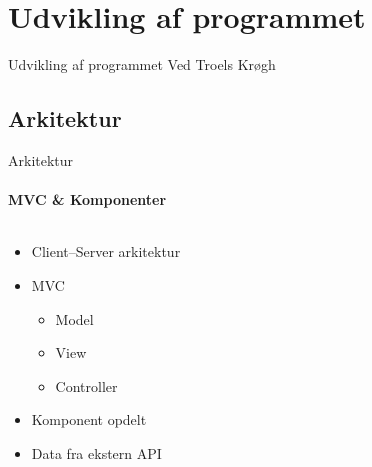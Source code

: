 \section{Udvikling af programmet}
	\begin{frame}{Udvikling af programmet}
		\LARGE Ved Troels Krøgh
	\end{frame}
	\subsection{Arkitektur}
		\begin{frame}[t]{Arkitektur}\framesubtitle{MVC \& Komponenter}
			\begin{columns}[T]
				\begin{column}{.48\textwidth}
					\begin{itemize}
						\item Client--Server arkitektur
						\item MVC
						\begin{itemize}
							\item Model
							\item View
							\item Controller
						\end{itemize}
						\item Komponent opdelt
						\item Data fra ekstern API
					\end{itemize}


\end{column}
\end{columns}
\end{frame}
